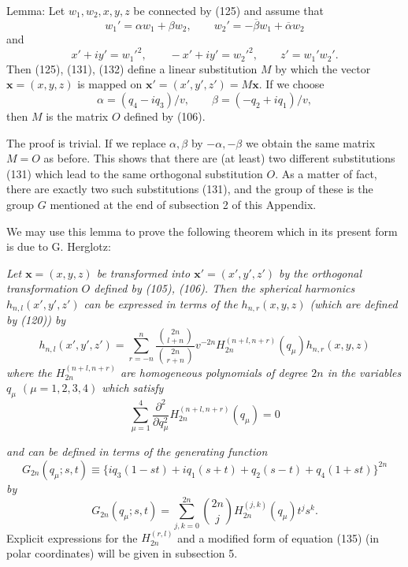 Lemma: Let $w_1,w_2,x,y,z$ be connected by (125) and assume that
\begin{equation}\tag{131}
w_1'=\alpha w_1+\beta w_2,\qquad
w_2'=-\overline\beta w_1+\overline\alpha w_2
\end{equation}
and
\begin{equation}\tag{132}
x'+iy'=w_1'^2,\qquad -x'+iy'=w_2'^2,\qquad z'=w_1'w_2'.
\end{equation}
Then (125), (131), (132) define a linear substitution $M$ by which the vector $\mathbf{x}=(x,y,z)$ is mapped on $\mathbf{x}'=(x',y',z')=M\mathbf{x}$. If we choose
\begin{equation}\tag{133}
\alpha=(q_4-iq_3)/v,\qquad \beta=(-q_2+iq_1)/v,
\end{equation}
then $M$ is the matrix $O$ defined by (106).

The proof is trivial. If we replace $\alpha,\beta$ by $-\alpha,-\beta$ we obtain the same matrix $M=O$ as before. This shows that there are (at least) two different substitutions (131) which lead to the same orthogonal substitution $O$. As a matter of fact, there are exactly two such substitutions (131), and the group of these is the group $G$ mentioned at the end of subsection 2 of this Appendix.

We may use this lemma to prove the following theorem which in its present form is due to G. Herglotz:

\emph{Let $\mathbf{x}=(x,y,z)$ be transformed into $\mathbf{x}'=(x',y',z')$ by the orthogonal transformation $O$ defined by (105), (106). Then the spherical harmonics $h_{n,l}(x',y',z')$ can be expressed in terms of the $h_{n,r}(x,y,z)$ (which are defined by (120)) by}
\begin{equation}\tag{134}
h_{n,l}(x',y',z')
=\sum_{r=-n}^{n}
\frac{\binom{2n}{l+n}}{\binom{2n}{r+n}}
 v^{-2n}H_{2n}^{(n+l,n+r)}(q_\mu)h_{n,r}(x,y,z)
\end{equation}
\emph{where the $H_{2n}^{(n+l,n+r)}$ are homogeneous polynomials of degree $2n$ in the variables $q_\mu$ $(\mu=1,2,3,4)$ which satisfy}
\begin{equation}\tag{135}
\sum_{\mu=1}^4\frac{\partial^2}{\partial q_\mu^2}H_{2n}^{(n+l,n+r)}(q_\mu)=0
\end{equation}

\emph{and can be defined in terms of the generating function}
\begin{equation}\tag{136}
G_{2n}(q_\mu;s,t)
\equiv\{iq_3(1-st)+iq_1(s+t)+q_2(s-t)+q_4(1+st)\}^{2n}
\end{equation}
\emph{by}
\begin{equation}\tag{137}
G_{2n}(q_\mu;s,t)=\sum_{j,k=0}^{2n}\binom{2n}{j}H_{2n}^{(j,k)}(q_\mu)t^js^k.
\end{equation}
Explicit expressions for the $H_{2n}^{(r,l)}$ and a modified form of equation (135) (in polar coordinates) will be given in subsection 5.

